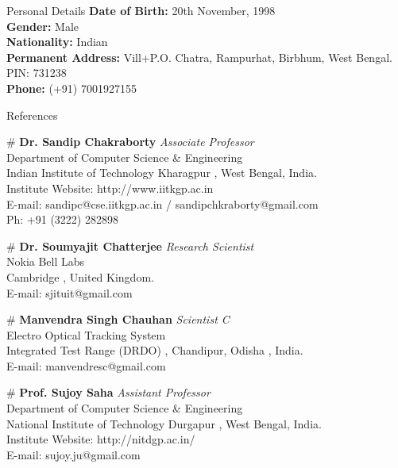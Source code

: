 \documentclass{resume} %
\begin{document}
	
	\begin{rSection}{Personal Details}
		\textbf{Date of Birth:} 20th November, 1998 \\
		\textbf{Gender:} Male \\ 
		\textbf{Nationality:} Indian\\
		\textbf{Permanent Address:} Vill+P.O. Chatra, Rampurhat, Birbhum, West Bengal. PIN: 731238\\
		\textbf{Phone:} (+91) 7001927155
		
	\end{rSection}
	
	
	\begin{rSection}{References}
		
		\item[\#] {\bf Dr. Sandip Chakraborty} \hfill {\em Associate Professor} \\
		Department of Computer Science \& Engineering \smallskip \\
		Indian Institute of Technology Kharagpur , West Bengal, India.\\
		Institute Website: http://www.iitkgp.ac.in \\
		E-mail: sandipc@cse.iitkgp.ac.in / sandipchkraborty@gmail.com \\Ph: +91 (3222) 282898 
		
		\item[\#] {\bf Dr. Soumyajit Chatterjee } \hfill {\em Research Scientist} \\
		Nokia Bell Labs\smallskip \\
		Cambridge , United Kingdom.\\
		E-mail: sjituit@gmail.com
		
		\item[\#] {\bf Manvendra Singh Chauhan  } \hfill {\em Scientist C} \\
		Electro Optical Tracking System \smallskip \\
		Integrated Test Range (DRDO) , Chandipur, Odisha , India.\\
		E-mail: manvendresc@gmail.com
		
				\item[\#] {\bf Prof. Sujoy Saha} \hfill {\em Assistant Professor} \\
		Department of Computer Science \& Engineering \smallskip \\
		National Institute of Technology Durgapur , West Bengal, India.\\
		Institute Website: http://nitdgp.ac.in/\\
		E-mail: sujoy.ju@gmail.com 
	\end{rSection}
	
	
\end{document}

